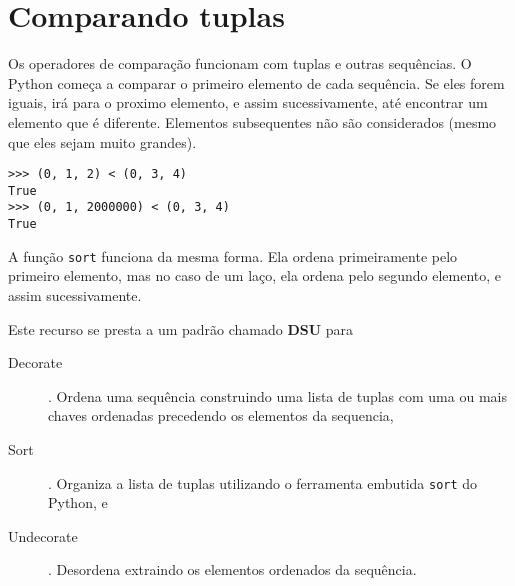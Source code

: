 \section{Comparando tuplas}


Os operadores de comparação funcionam com tuplas e outras sequências.
O Python começa a comparar o primeiro elemento de cada sequência.
Se eles forem iguais, irá para o proximo elemento, e assim sucessivamente,
até encontrar um elemento que é diferente. Elementos subsequentes
não são considerados (mesmo que eles sejam muito grandes).

\beforeverb
\begin{verbatim}
>>> (0, 1, 2) < (0, 3, 4)
True
>>> (0, 1, 2000000) < (0, 3, 4)
True
\end{verbatim}
\afterverb
%
A função {\tt sort} funciona da mesma forma. Ela ordena
primeiramente pelo primeiro elemento, mas no caso de um laço,
ela ordena pelo segundo elemento, e assim sucessivamente.

Este recurso se presta a um padrão chamado {\bf DSU} para

\begin{description}

\item[Decorate]. Ordena uma sequência construindo uma lista de tuplas
com uma ou mais chaves ordenadas precedendo os elementos da sequencia,

\item[Sort]. Organiza a lista de tuplas utilizando o ferramenta embutida 
{\tt sort} do Python, e

\item[Undecorate]. Desordena extraindo os elementos ordenados da sequência.

\end{description}

